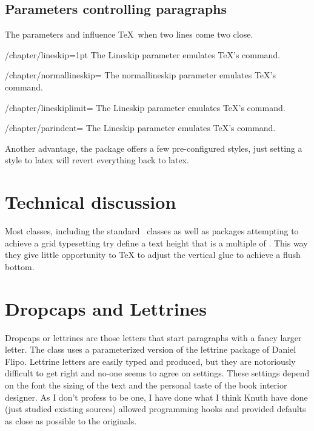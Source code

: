 \subsection{Parameters controlling paragraphs}
The parameters  and  influence \TeX\ when two lines come two close.
\medskip



\begin{key}{/chapter/lineskip=1pt} 
	The Lineskip parameter emulates \TeX's \cmd{\lineskip} command.
\end{key}

\begin{key}{/chapter/normallineskip=} 
	The normallineskip parameter emulates \TeX's \cmd{\normallineskip} command.
\end{key}

\begin{key}{/chapter/lineskiplimit=} 
	The Lineskip parameter emulates \TeX's \cmd{\lineskiplimit} command.
\end{key}

\begin{key}{/chapter/parindent=} 
	The Lineskip parameter emulates \TeX's \cmd{\parindent} command.
\end{key}



Another advantage, the package offers a few pre-configured styles, just setting a style to latex will revert everything back to latex.

\section{Technical discussion}

Most classes, including the standard \LaTeXe\ classes as well as packages attempting to achieve a grid typesetting try define a text height that is a multiple of . This way they give little opportunity to TeX to adjust the vertical glue to achieve a flush bottom.

\section{Dropcaps and Lettrines}

Dropcaps or lettrines are those letters that start paragraphs with a fancy larger letter. The class uses a parameterized version of the lettrine package of Daniel Flipo. Lettrine letters are easily typed and produced, but they are notoriously difficult to get right and no-one seems to agree on settings. These settings depend on the font the sizing of the text and the personal taste of the book interior designer. As I don't profess to be one, I have done what I think Knuth have done (just studied existing sources) allowed programming hooks and provided defaults as close as possible to the originals.


